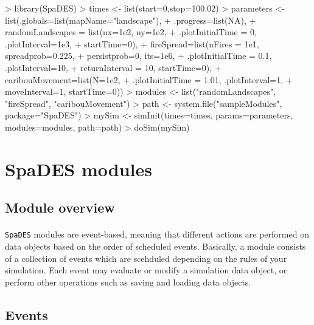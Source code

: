 \documentclass{article}
\begin{document}
\begin{Schunk}
\begin{Sinput}
> library(SpaDES)
> times <- list(start=0,stop=100.02)
> parameters <- list(.globals=list(mapName="landscape"),
+                   .progress=list(NA),
+                   randomLandscapes = list(nx=1e2, ny=1e2,
+                                           .plotInitialTime = 0, .plotInterval=1e3,
+                                           startTime=0),
+                   fireSpread=list(nFires = 1e1, spreadprob=0.225,
+                                   persistprob=0, its=1e6,
+                                   .plotInitialTime = 0.1, .plotInterval=10,
+                                   returnInterval = 10, startTime=0),
+                   caribouMovement=list(N=1e2,
+                                        .plotInitialTime = 1.01, .plotInterval=1,
+                                        moveInterval=1, startTime=0))
> modules <- list("randomLandscapes", "fireSpread", "caribouMovement")
> path <- system.file("sampleModules", package="SpaDES")
> mySim <- simInit(times=times, params=parameters, modules=modules, path=path)
> doSim(mySim)
\end{Sinput}
\end{Schunk}

\newpage

\section{SpaDES modules}

\subsection{Module overview}

\paragraph{}
\texttt{SpaDES} modules are event-based, meaning that different actions are performed on data objects based on the order of scheduled events. Basically, a module consists of a collection of events which are scehduled depending on the rules of your simulation. Each event may evaluate or modify a simulation data object, or perform other operations such as saving and loading data objects.

\subsection{Events}
\end{document}
